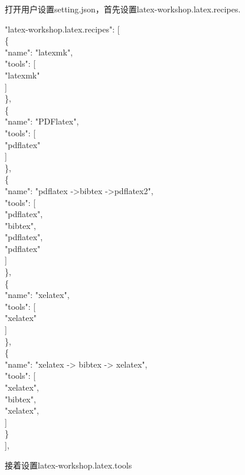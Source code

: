 \documentclass[10pt, UTF8]{ctexart}%
\def\CodingInline#1{\colorbox{shadecolor}{\color{black}#1}}%
\def\CodingBlock#1{\begin{shaded} \noindent#1 \end{shaded}}
\begin{document}
        打开用户设置\CodingInline{setting.json}，首先设置\CodingInline{latex-workshop.latex.recipes}.
        \CodingBlock{"latex-workshop.latex.recipes": [ \\ 
            \{  \\
              "name": "latexmk",  \\
              "tools": [  \\
                "latexmk"  \\
              ]  \\
            \},  \\
            \{  \\
              "name": "PDFlatex",  \\
              "tools": [  \\
              "pdflatex"  \\
              ]  \\
            \},  \\
            \{  \\
              "name": "pdflatex ->bibtex ->pdflatex2",  \\
              "tools": [  \\
                "pdflatex", \\ 
                "bibtex",  \\
                "pdflatex",  \\
                "pdflatex"  \\
              ]  \\
            \},  \\
            \{  \\
              "name": "xelatex",\\  
              "tools": [  \\
                "xelatex"  \\
              ]  \\
            \},  \\
            \{  \\
              "name": "xelatex -> bibtex -> xelatex",  \\
              "tools": [  \\
                "xelatex",  \\
                "bibtex",  \\
                "xelatex",  \\
              ]  \\
            \}  \\
          ],  }
          接着设置\CodingInline{latex-workshop.latex.tools}
\end{document}
